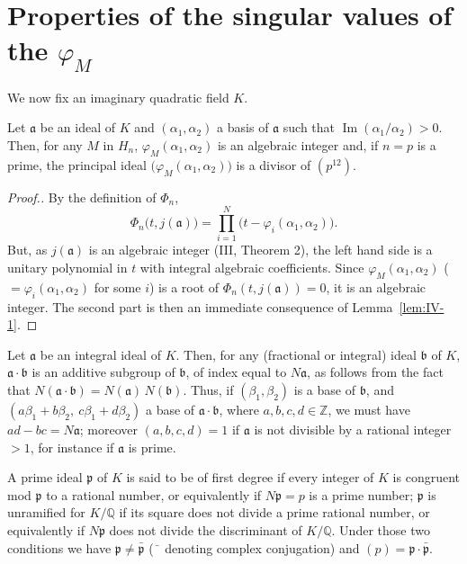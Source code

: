 \section{\texorpdfstring{Properties of the singular values of the $\varphi_{M}$}{Properties of the singular values of the varphi M}}\label{sec:IV-singular}

We now fix an imaginary quadratic field $K$.

\begin{lemma}\label{lem:IV-2}
Let $\mathfrak{a}$ be an ideal of $K$ and $(\alpha_{1},\alpha_{2})$ a
basis of $\mathfrak{a}$ such that
$\operatorname{Im}(\alpha_{1}/\alpha_{2})>0$. Then, for any $M$ in
$H_{n}$, $\varphi_{M}(\alpha_{1},\alpha_{2})$ is an algebraic integer
and, if $n=p$ is a prime, the principal ideal
$\bigl(\varphi_{M}(\alpha_{1},\alpha_{2})\bigr)$ is a divisor of
$(p^{12})$.
\end{lemma}

\begin{proof}[Proof.]
By the definition of $\Phi_{n}$,
\[
\Phi_{n}\bigl(t,j(\mathfrak{a})\bigr)
=\prod_{i=1}^{N}\bigl(t-\varphi_{i}(\alpha_{1},\alpha_{2})\bigr).
\]
But, as $j(\mathfrak{a})$ is an algebraic integer (III, Theorem 2), the
left hand side is a unitary polynomial in $t$ with integral algebraic
coefficients. Since
$\varphi_{M}(\alpha_{1},\alpha_{2})$
($=\varphi_{i}(\alpha_{1},\alpha_{2})$ for some $i$) is a root of
$\Phi_{n}(t,j(\mathfrak{a}))=0$, it is an algebraic integer. The second
part is then an immediate consequence of Lemma~\ref{lem:IV-1}.
\end{proof}

Let $\mathfrak{a}$ be an integral ideal of $K$. Then, for any (fractional
or integral) ideal $\mathfrak{b}$ of $K$, $\mathfrak{a}\cdot\mathfrak{b}$
is an additive subgroup of $\mathfrak{b}$, of index equal to $N\mathfrak{a}$,
as follows from the fact that
$N(\mathfrak{a}\cdot\mathfrak{b})=N(\mathfrak{a})\,N(\mathfrak{b})$. Thus,
if $(\beta_{1},\beta_{2})$ is a base of $\mathfrak{b}$, and
$(a\beta_{1}+b\beta_{2},\ c\beta_{1}+d\beta_{2})$ a base of
$\mathfrak{a}\cdot\mathfrak{b}$, where $a,b,c,d\in\mathbb{Z}$, we must
have $ad-bc=N\mathfrak{a}$; moreover $(a,b,c,d)=1$ if $\mathfrak{a}$ is
not divisible by a rational integer $>1$, for instance if $\mathfrak{a}$
is prime.

A prime ideal $\mathfrak{p}$ of $K$ is said to be of first degree if
every integer of $K$ is congruent mod $\mathfrak{p}$ to a rational number,
or equivalently if $N\mathfrak{p}=p$ is a prime number; $\mathfrak{p}$ is
unramified for $K/\mathbb{Q}$ if its square does not divide a prime
rational number, or equivalently if $N\mathfrak{p}$ does not divide the
discriminant of $K/\mathbb{Q}$. Under those two conditions we have
$\mathfrak{p}\neq\bar{\mathfrak{p}}$ ($\bar{\phantom{x}}$ denoting complex
conjugation) and $(p)=\mathfrak{p}\cdot\bar{\mathfrak{p}}$.

